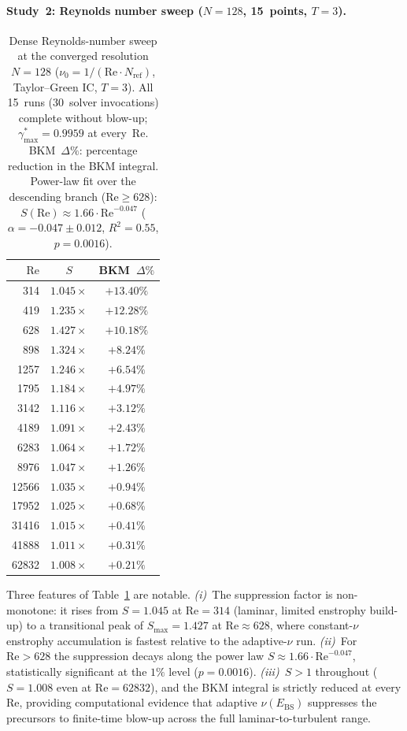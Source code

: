 \documentclass[final]{siamltex}
\begin{document}
\begin{appendix}
\paragraph{Study~2: Reynolds number sweep
  ($N=128$, 15~points, $T=3$).}

\begin{table}[htbp]
\centering
\caption{Dense Reynolds-number sweep at the converged resolution
  $N=128$ ($\nu_0=1/(\mathrm{Re}\cdot N_{\text{ref}})$,
  Taylor--Green IC, $T=3$).  All 15~runs (30~solver invocations)
  complete without blow-up; $\gamma^*_{\max}=0.9959$ at every~Re.
  BKM~$\Delta\%$: percentage reduction in the BKM integral.
  Power-law fit over the descending branch
  ($\mathrm{Re}\ge 628$):
  $S(\mathrm{Re})\approx 1.66\cdot\mathrm{Re}^{-0.047}$
  ($\alpha=-0.047\pm 0.012$, $R^2=0.55$, $p=0.0016$).}
\label{tab:ns_re_sweep}
\begin{tabular}{@{}rcc@{}}
\toprule
$\mathrm{Re}$ & $S$ & BKM~$\Delta\%$\\
\midrule
   314 & $1.045\times$ & $+13.40\%$\\
   419 & $1.235\times$ & $+12.28\%$\\
   628 & $\mathbf{1.427\times}$ & $+10.18\%$\\
   898 & $1.324\times$ & $+8.24\%$\\
  1257 & $1.246\times$ & $+6.54\%$\\
  1795 & $1.184\times$ & $+4.97\%$\\
  3142 & $1.116\times$ & $+3.12\%$\\
  4189 & $1.091\times$ & $+2.43\%$\\
  6283 & $1.064\times$ & $+1.72\%$\\
  8976 & $1.047\times$ & $+1.26\%$\\
 12566 & $1.035\times$ & $+0.94\%$\\
 17952 & $1.025\times$ & $+0.68\%$\\
 31416 & $1.015\times$ & $+0.41\%$\\
 41888 & $1.011\times$ & $+0.31\%$\\
 62832 & $1.008\times$ & $+0.21\%$\\
\bottomrule
\end{tabular}
\end{table}

Three features of Table~\ref{tab:ns_re_sweep} are notable.
\textit{(i)}~The suppression factor is non-monotone: it rises from
$S=1.045$ at $\mathrm{Re}=314$ (laminar, limited enstrophy
build-up) to a transitional peak of $S_{\max}=1.427$ at
$\mathrm{Re}\approx 628$, where constant-$\nu$ enstrophy
accumulation is fastest relative to the adaptive-$\nu$ run.
\textit{(ii)}~For $\mathrm{Re}>628$ the suppression decays along
the power law $S\approx 1.66\cdot\mathrm{Re}^{-0.047}$,
statistically significant at the $1\%$ level ($p=0.0016$).
\textit{(iii)}~$S>1$ throughout ($S=1.008$ even at
$\mathrm{Re}=62832$), and the BKM integral is strictly reduced at
every Re, providing computational evidence that adaptive
$\nu(E_\mathrm{BS})$ suppresses the precursors to finite-time
blow-up across the full laminar-to-turbulent range.


\end{appendix}
\end{document}

